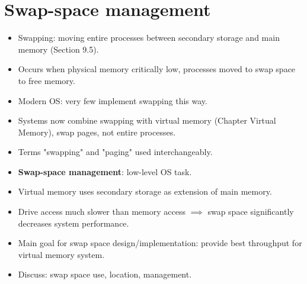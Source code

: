 \section{Swap-space management}

\begin{itemize}
    \item Swapping: moving entire processes between secondary storage and main memory (Section 9.5).
    \item Occurs when physical memory critically low, processes moved to swap space to free memory.
    \item Modern OS: very few implement swapping this way.
    \item Systems now combine swapping with virtual memory (Chapter Virtual Memory), swap pages, not entire processes.
    \item Terms "swapping" and "paging" used interchangeably.
    \item \textbf{Swap-space management}: low-level OS task.
    \item Virtual memory uses secondary storage as extension of main memory.
    \item Drive access much slower than memory access $\implies$ swap space significantly decreases system performance.
    \item Main goal for swap space design/implementation: provide best throughput for virtual memory system.
    \item Discuss: swap space use, location, management.
\end{itemize}

